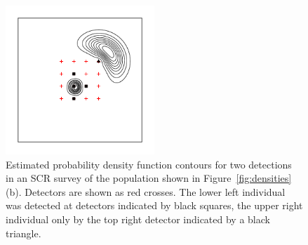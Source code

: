 \documentclass[10pt,a4paper]{article}
\begin{document}
\begin{figure}[htbp]
\centering
\includegraphics[width=0.5\textwidth]{screrr.pdf}
\caption{Estimated probability density function contours for two detections in an SCR survey of the population shown in Figure~\ref{fig:densities}(b). Detectors are shown as red crosses. The lower left individual was detected at detectors indicated by black squares, the upper right individual only by the top right detector indicated by a black triangle.}
\label{fig:screrr}
\end{figure}


\end{document}
